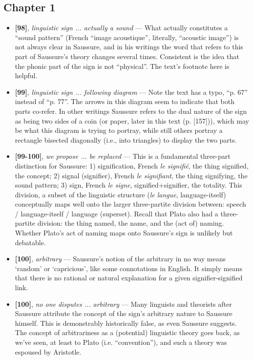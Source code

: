 \documentclass[12pt]{article}
\begin{document}
\subsection{Chapter 1}

\begin{itemize}

\item \textbf{[98]}, \textit{linguistic sign ... actually a sound} --- What actually constitutes a ``sound pattern'' (French ``image acoustique'', literally, ``acoustic image'') is not always clear in Saussure, and in his writings the word that refers to this part of Saussure's theory changes several times. Consistent is the idea that the phonic part of the sign is not ``physical''. The text's footnote here is helpful.

\item \textbf{[99]}, \textit{linguistic sign ... following diagram} --- Note the text has a typo, ``p. 67'' instead of ``p. 77''. The arrows in this diagram seem to indicate that both parts co-refer. In other writings Saussure refers to the dual nature of the sign as being two sides of a coin (or paper, later in this text (p. [157])), which may be what this diagram is trying to portray, while still others portray a rectangle bisected diagonally (i.e., into triangles) to display the two parts.

\item \textbf{[99-100]}, \textit{we propose ... be replaced} --- This is a fundamental three-part distinction for Saussure: 1) signification, French \textit{le signifi\'{e}}, the thing signified, the concept; 2) signal (signifier), French \textit{le signifiant}, the thing signifying, the sound pattern; 3) sign, French \textit{le signe}, signified+signifier, the totality. This division, a subset of the linguistic structure (\textit{le langue}, language-itself) conceptually maps well onto the larger three-partite division between: speech / language-itself / language (superset). Recall that Plato also had a three-partite division: the thing named, the name, and the (act of) naming. Whether Plato's act of naming maps onto Saussure's sign is unlikely but debatable.

\item \textbf{[100]}, \textit{arbitrary} --- Saussure's notion of the arbitrary in no way means `random' or `capricious', like some connotations in English. It simply means that there is no rational or natural explanation for a given signifier-signified link.

\item \textbf{[100]}, \textit{no one disputes ... arbitrary} --- Many linguists and theorists after Saussure attribute the concept of the sign's arbitrary nature to Saussure himself. This is demonstrably historically false, as even Saussure suggests. The concept of arbitrariness as a (potential) linguistic theory goes back, as we've seen, at least to Plato (i.e. ``convention''), and such a theory was espoused by Aristotle.


\end{itemize}
\end{document}
